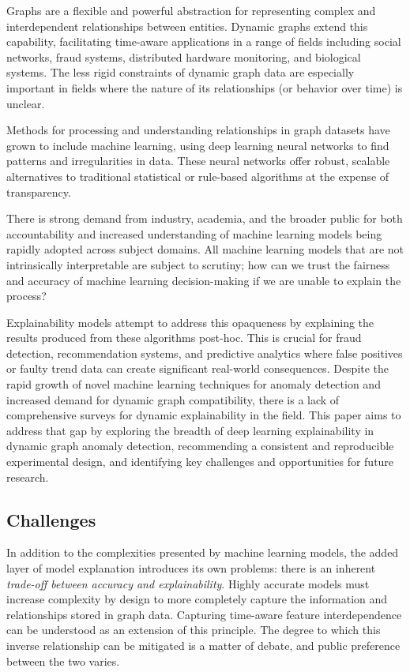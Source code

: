 Graphs are a flexible and powerful abstraction for representing complex and interdependent relationships between entities. Dynamic graphs extend this capability, facilitating time-aware applications in a range of fields including social networks, fraud systems, distributed hardware monitoring, and biological systems. The less rigid constraints of dynamic graph data are especially important in fields where the nature of its relationships (or behavior over time) is unclear.

Methods for processing and understanding relationships in graph datasets have grown to include machine learning, using deep learning neural networks to find patterns and irregularities in data. These neural networks offer robust, scalable alternatives to traditional statistical or rule-based algorithms at the expense of transparency.

There is strong demand from industry, academia, and the broader public for both accountability and increased understanding of machine learning models being rapidly adopted across subject domains\cite{weber_quantifying_2021}\cite{rueda_just_2022}\cite{deeks_judicial_2019}. All machine learning models that are not intrinsically interpretable are subject to scrutiny; how can we trust the fairness and accuracy of machine learning decision-making if we are unable to explain the process?

Explainability models attempt to address this opaqueness by explaining the results produced from these algorithms post-hoc. This is crucial for fraud detection, recommendation systems, and predictive analytics where false positives or faulty trend data can create significant real-world consequences. Despite the rapid growth of novel machine learning techniques for anomaly detection and increased demand for dynamic graph compatibility, there is a lack of comprehensive surveys for dynamic explainability in the field. This paper aims to address that gap by exploring the breadth of deep learning explainability in dynamic graph anomaly detection, recommending a consistent and reproducible experimental design, and identifying key challenges and opportunities for future research.

\subsection{Challenges}
In addition to the complexities presented by machine learning models, the added layer of model explanation introduces its own problems: there is an inherent \textit{trade-off between accuracy and explainability}. Highly accurate models must increase complexity by design to more completely capture the information and relationships stored in graph data. Capturing time-aware feature interdependence can be understood as an extension of this principle. The degree to which this inverse relationship can be mitigated is a matter of debate\cite{bell_its_2022}, and public preference between the two varies\cite{van_der_veer_trading_2021}.

